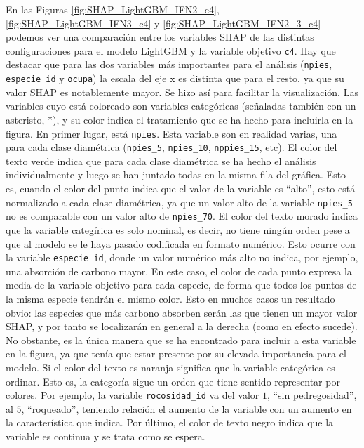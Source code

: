En las Figuras \ref{fig:SHAP_LightGBM_IFN2_c4}, \ref{fig:SHAP_LightGBM_IFN3_c4} y \ref{fig:SHAP_LightGBM_IFN2_3_c4} podemos ver una comparación entre los variables SHAP de las distintas configuraciones para el modelo LightGBM y la variable objetivo \texttt{c4}. Hay que destacar que para las dos variables más importantes para el análisis (\texttt{npies}, \texttt{especie\_id} y \texttt{ocupa}) la escala del eje x es distinta que para el resto, ya que su valor SHAP es notablemente mayor. Se hizo así para facilitar la visualización. Las variables cuyo está coloreado son variables categóricas (señaladas también con un asteristo, *), y su color indica el tratamiento que se ha hecho para incluirla en la figura. En primer lugar, está \texttt{npies}. Esta variable son en realidad varias, una para cada clase diamétrica (\texttt{npies\_5}, \texttt{npies\_10}, \texttt{nppies\_15}, etc). El color del texto verde indica que para cada clase diamétrica se ha hecho el análisis individualmente y luego se han juntado todas en la misma fila del gráfica. Esto es, cuando el color del punto indica que el valor de la variable es ``alto'', esto está normalizado a cada clase diamétrica, ya que un valor alto de la variable \texttt{npies\_5} no es comparable con un valor alto de \texttt{npies\_70}. El color del texto morado indica que la variable categírica es solo nominal, es decir, no tiene ningún orden pese a que al modelo se le haya pasado codificada en formato numérico. Esto ocurre con la variable \texttt{especie\_id}, donde un valor numérico más alto no indica, por ejemplo, una absorción de carbono mayor. En este caso, el color de cada punto expresa la media de la variable objetivo para cada especie, de forma que todos los puntos de la misma especie tendrán el mismo color. Esto en muchos casos un resultado obvio: las especies que más carbono absorben serán las que tienen un mayor valor SHAP, y por tanto se localizarán en general a la derecha (como en efecto sucede). No obstante, es la única manera que se ha encontrado para incluir a esta variable en la figura, ya que tenía que estar presente por su elevada importancia para el modelo. Si el color del texto es naranja significa que la variable categórica es ordinar. Esto es, la categoría sigue un orden que tiene sentido representar por colores. Por ejemplo, la variable \texttt{rocosidad\_id} va del valor $1$, ``sin pedregosidad'', al $5$, ``roqueado'', teniendo relación el aumento de la variable con un aumento en la característica que indica. Por último, el color de texto negro indica que la variable es continua y se trata como se espera.

